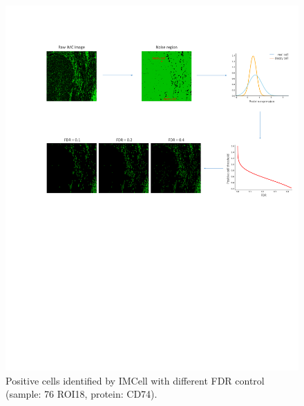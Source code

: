 \documentclass{mynature}
\begin{document}
\begin{figure}[!htb]
  \centering
  \includegraphics[width=\linewidth]{Figure/Figure4.pdf}
  \caption{Positive cells identified by IMCell with different FDR control (sample: 76 ROI18, protein: CD74). 
  }
  \label{fig4:pos}
\end{figure}
\end{document}
